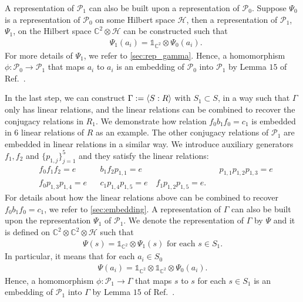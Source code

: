 \documentclass[11pt,letterpaper]{article}
\newcommand{\x}{\otimes}
\DeclarePairedDelimiter{\ip}{\langle}{\rangle}
\newcommand{\C}{\mathbb{C}}
\newcommand{\calH}{\mathcal{H}}
\newcommand{\1}{\mathbb{1}}
\newcommand{\Pg}{\mathcal{P}}
\theoremstyle{definition}
\begin{document}
A representation of $\Pg_1$ can also be built upon a representation of $\Pg_0$.
Suppose $\Psi_0$ is a representation of $\Pg_0$ on some Hilbert space $\calH$, then 
 a representation of $\Pg_1$, $\Psi_1$, on the Hilbert space $\C^2 \x \calH$ can
 be constructed such that
\begin{align*}
    &\Psi_1(a_i) = \1_{\C^2} \x \Psi_0(a_i).
\end{align*}
For more details of $\Psi_1$, we refer to \cref{sec:rep_gamma}.
Hence, a homomorphism $\phi: \Pg_0 \rightarrow \Pg_1$ that 
maps $a_i$ to $a_i$ is an embedding of $\Pg_0$ into $\Pg_1$
by Lemma $15$ of Ref.~\cite{slofstra2017}.



In the last step, we can construct $\Gamma:= \ip{S:R}$ with $S_1 \subset S$, in a way such that
$\Gamma$ only has linear relations, and the linear relations can be combined
to recover the conjugacy relations in $R_1$.
We demonstrate how relation $f_0 b_1 f_0 = c_1$ is embedded in
$6$ linear relations of $R$ as an example. 
The other conjugacy relations of $\Pg_1$ are embedded in linear relations in a similar way.
We introduce auxiliary generators $f_1, f_2$ and $\{p_{1,j}\}_{j=1}^5$ and they satisfy the linear relations:
\begin{align*}
    &f_0 f_1 f_2 = e && b_1 f_2 p_{1,1} = e && p_{1,1} p_{1,2} p_{1,3} = e\\
	&f_0 p_{1,3} p_{1,4} = e && c_1 p_{1,4} p_{1,5} = e \quad f_1 p_{1,2} p_{1,5} = e.
\end{align*}
For details about how the linear relations above
can be combined to recover $f_0b_1f_0 = c_1$, we refer to \cref{sec:embedding}.
A representation of $\Gamma$ can also be built upon
the representation $\Psi_1$ of $\Pg_1$.
We denote the representation of $\Gamma$ by $\Psi$ and
it is defined on $\C^2 \x \C^2 \x \calH$ such that
\begin{align*}
    \Psi(s) = \1_{\C^2} \x \Psi_1(s) \text{ for each }
    s \in S_1.
\end{align*}
In particular, it means that for each $a_i \in S_0$
\begin{align*}
    \Psi(a_i) = \1_{\C^2} \x \1_{\C^2} \x \Psi_0(a_i).
\end{align*}
Hence, a homomorphism $\phi: \Pg_1 \rightarrow \Gamma$ that 
maps $s$ to $s$ for each $s \in S_1$ is an embedding of $\Pg_1$ into $\Gamma$
by Lemma $15$ of Ref.~\cite{slofstra2017}.


\end{document}
